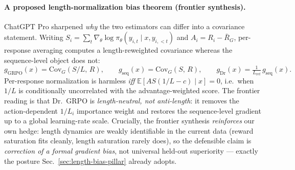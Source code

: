 \paragraph{A proposed length-normalization bias theorem (frontier synthesis).}
ChatGPT Pro sharpened \emph{why} the two estimators can differ into a covariance
statement. Writing $S_i=\sum_{t}\nabla_\theta\log\pi_\theta(y_{i,t}\mid x,y_{i,<t})$
and $A_i=R_i-\bar R_G$, per-response averaging computes a length-reweighted
covariance whereas the sequence-level object does not:
\begin{equation}
g_{\mathrm{GRPO}}(x)=\mathrm{Cov}_G\!\left(S/L,\,R\right),
\qquad
g_{\mathrm{seq}}(x)=\mathrm{Cov}_G\!\left(S,\,R\right),
\qquad
g_{\mathrm{Dr}}(x)=\tfrac{1}{L_{\mathrm{ref}}}\,g_{\mathrm{seq}}(x).
\end{equation}
Per-response normalization is harmless \emph{iff}
$\mathbb{E}\!\left[AS\left(1/L-c\right)\mid x\right]=0$, i.e.\ when $1/L$ is
conditionally uncorrelated with the advantage-weighted score. The frontier
reading is that Dr.~GRPO is \emph{length-neutral, not anti-length}: it removes
the action-dependent $1/L_i$ importance weight and restores the sequence-level
gradient up to a global learning-rate scale. Crucially, the frontier synthesis
\emph{reinforces} our own hedge: length dynamics are weakly identifiable in the
current data (reward saturation fits cleanly, length saturation rarely does), so
the defensible claim is \emph{correction of a formal gradient bias}, not
universal held-out superiority --- exactly the posture Sec.~\ref{sec:length-bias-pillar}
already adopts.

